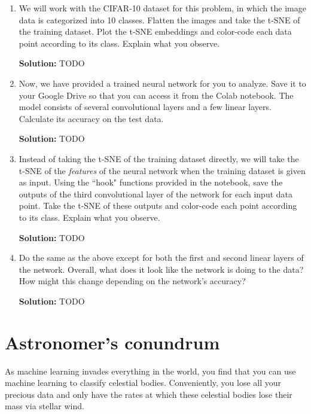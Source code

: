 \documentclass{article}
\newcommand{\Question}[1]{\Large \section{ #1 } \normalsize}
\newenvironment{solution}{\color{blue} \smallskip \textbf{Solution:}}{}
\begin{document}
\begin{enumerate}
\item We will work with the CIFAR-10 dataset for this problem, in which the image data is categorized into 10 classes. Flatten the images and take the t-SNE of the training dataset. Plot the t-SNE embeddings and color-code each data point according to its class. Explain what you observe.

\begin{solution}
    TODO
\end{solution}

\newpage
\item Now, we have provided a trained neural network for you to analyze. Save it to your Google Drive so that you can access it from the Colab notebook. The model consists of several convolutional layers and a few linear layers. Calculate its accuracy on the test data. 

\begin{solution}
    TODO
\end{solution}

\newpage
\item Instead of taking the t-SNE of the training dataset directly, we will take the t-SNE of the \textit{features} of the neural network when the training dataset is given as input. Using the ``hook" functions provided in the notebook, save the outputs of the third convolutional layer of the network for each input data point. Take the t-SNE of these outputs and color-code each point according to its class. Explain what you observe.

\begin{solution}
    TODO
\end{solution}

\newpage
\item Do the same as the above except for both the first and second linear layers of the network. Overall, what does it look like the network is doing to the data? How might this change depending on the network's accuracy?

\begin{solution}
    TODO
\end{solution}

\end{enumerate}

\newpage
\Question{Astronomer's conundrum}

As machine learning invades everything in the world, you find that you can use machine learning to classify celestial bodies. Conveniently, you lose all your precious data and only have the rates at which these celestial bodies lose their mass via stellar wind.
\end{document}

